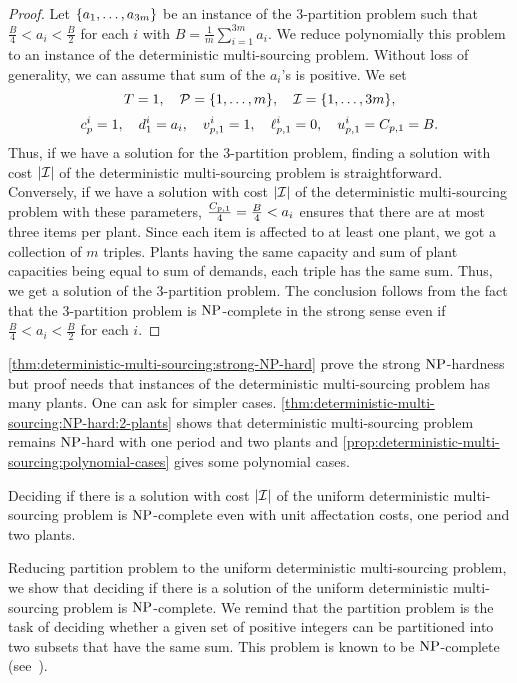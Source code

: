 \begin{proof}
Let $\crbracket{a_1,\ldots,a_{3m}}$ be an instance of the 3-partition problem such that $\frac{B}{4} < a_i < \frac{B}{2}$ for each $i$ with $B=\frac{1}{m}\sum_{i=1}^{3m}a_i$.
We reduce polynomially this problem to an instance of the deterministic multi-sourcing problem.
Without loss of generality, we can assume that sum of the $a_i$'s is positive.
We set
$$
  \horizon=1
  ,\quad
  \plants=\range[1]{m}
  ,\quad
  \REF=\range[1]{3m},
$$
$$
  c_p^i=1
  ,\quad
  d_1^i=a_i
  ,\quad
  v_{p,1}^i=1
  ,\quad
  \ell_{p,1}^i=0
  ,\quad
  u_{p,1}^i=C_{p,1}=B.
$$
Thus, if we have a solution for the 3-partition problem, finding a solution with cost $\card{\REF}$ of the deterministic multi-sourcing problem is straightforward.
Conversely, if we have a solution with cost $\card{\REF}$ of the deterministic multi-sourcing problem with these parameters, $\frac{C_{p,1}}{4}=\frac{B}{4} < a_i$ ensures that there are at most three items per plant.
Since each item is affected to at least one plant, we got a collection of $m$ triples.
Plants having the same capacity and sum of plant capacities being equal to sum of demands, each triple has the same sum.
Thus, we get a solution of the 3-partition problem.
The conclusion follows from the fact that the 3-partition problem is $\operatorname{NP}$-complete in the strong sense even if $\frac{B}{4} < a_i < \frac{B}{2}$ for each $i$.
\end{proof}


\cref{thm:deterministic-multi-sourcing:strong-NP-hard} prove the strong $\operatorname{NP}$-hardness but proof needs that instances of the deterministic multi-sourcing problem has many plants.
One can ask for simpler cases.
\cref{thm:deterministic-multi-sourcing:NP-hard:2-plants} shows that deterministic multi-sourcing problem remains $\operatorname{NP}$-hard with one period and two plants and \cref{prop:deterministic-multi-sourcing:polynomial-cases} gives some polynomial cases.


\begin{thm}\label{thm:deterministic-multi-sourcing:NP-hard:2-plants}
Deciding if there is a solution with cost $\card{\REF}$ of the uniform deterministic multi-sourcing problem is $\operatorname{NP}$-complete even with unit affectation costs, one period and two plants.
\end{thm}


Reducing partition problem to the uniform deterministic multi-sourcing problem, we show that deciding if there is a solution of the uniform deterministic multi-sourcing problem is $\operatorname{NP}$-complete. We remind that the partition problem is the task of deciding whether a given set of positive integers can be partitioned into two subsets that have the same sum. This problem is known to be $\operatorname{NP}$-complete (see~\cite{Garey1979}).


